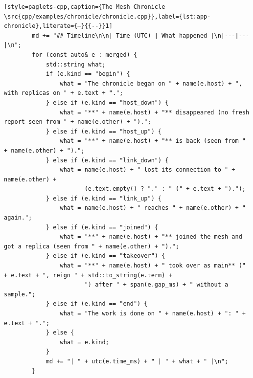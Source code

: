 \begin{lstlisting}[style=paglets-cpp,caption={The Mesh Chronicle \src{cpp/examples/chronicle/chronicle.cpp}},label={lst:app-chronicle},literate={–}{{--}}1]
        md += "## Timeline\n\n| Time (UTC) | What happened |\n|---|---|\n";
        for (const auto& e : merged) {
            std::string what;
            if (e.kind == "begin") {
                what = "The chronicle began on " + name(e.host) + ", with replicas on " + e.text + ".";
            } else if (e.kind == "host_down") {
                what = "**" + name(e.host) + "** disappeared (no fresh report seen from " + name(e.other) + ").";
            } else if (e.kind == "host_up") {
                what = "**" + name(e.host) + "** is back (seen from " + name(e.other) + ").";
            } else if (e.kind == "link_down") {
                what = name(e.host) + " lost its connection to " + name(e.other) +
                       (e.text.empty() ? "." : " (" + e.text + ").");
            } else if (e.kind == "link_up") {
                what = name(e.host) + " reaches " + name(e.other) + " again.";
            } else if (e.kind == "joined") {
                what = "**" + name(e.host) + "** joined the mesh and got a replica (seen from " + name(e.other) + ").";
            } else if (e.kind == "takeover") {
                what = "**" + name(e.host) + " took over as main** (" + e.text + ", reign " + std::to_string(e.term) +
                       ") after " + span(e.gap_ms) + " without a sample.";
            } else if (e.kind == "end") {
                what = "The work is done on " + name(e.host) + ": " + e.text + ".";
            } else {
                what = e.kind;
            }
            md += "| " + utc(e.time_ms) + " | " + what + " |\n";
        }


\end{lstlisting}
